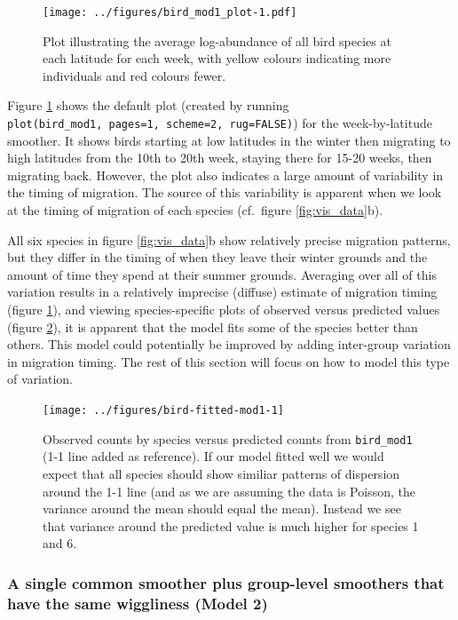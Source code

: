 \documentclass[12pt]{article}
\begin{document}
\begin{figure}
\centering
\texttt{[image: ../figures/bird\_mod1\_plot-1.pdf]}
\caption{\label{fig:bird_mod1} Plot illustrating the average
log-abundance of all bird species at each latitude for each week, with
yellow colours indicating more individuals and red colours fewer.}
\end{figure}

Figure \ref{fig:bird_mod1} shows the default plot (created by running
\texttt{plot(bird\_mod1,\ pages=1,\ scheme=2,\ rug=FALSE)}) for the
week-by-latitude smoother. It shows birds starting at low latitudes in
the winter then migrating to high latitudes from the 10th to 20th week,
staying there for 15-20 weeks, then migrating back. However, the plot
also indicates a large amount of variability in the timing of migration.
The source of this variability is apparent when we look at the timing of
migration of each species (cf.~figure \ref{fig:vis_data}b).

All six species in figure \ref{fig:vis_data}b show relatively precise
migration patterns, but they differ in the timing of when they leave
their winter grounds and the amount of time they spend at their summer
grounds. Averaging over all of this variation results in a relatively
imprecise (diffuse) estimate of migration timing (figure
\ref{fig:bird_mod1}), and viewing species-specific plots of observed
versus predicted values (figure \ref{fig:bird-fitted-mod1}), it is
apparent that the model fits some of the species better than others.
This model could potentially be improved by adding inter-group variation
in migration timing. The rest of this section will focus on how to model
this type of variation.

\begin{figure}
\texttt{[image: ../figures/bird-fitted-mod1-1]} \caption{\label{fig:bird-fitted-mod1}Observed counts by species versus predicted counts from \texttt{bird\_mod1} (1-1 line added as reference). If our model fitted well we would expect that all species should show similiar patterns of dispersion around the 1-1 line (and as we are assuming the data is Poisson, the variance around the mean should equal the mean). Instead we see that variance around the predicted value is much higher for species 1 and 6.}\label{fig:bird-fitted-mod1}
\end{figure}

\subsubsection{A single common smoother plus group-level smoothers that
have the same wiggliness (Model
2)}\label{a-single-common-smoother-plus-group-level-smoothers-that-have-the-same-wiggliness-model-2}
\end{document}
